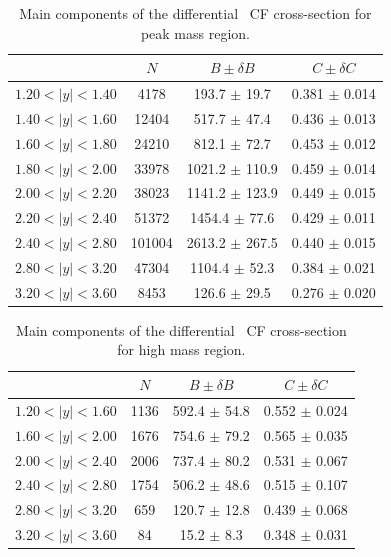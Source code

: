 \begin{table}
\centering
\begin{tabular}{lccc}
\hline \hline
    &   $N$   & $B \pm \delta B$  &  $C \pm \delta C$ \\
\hline
$1.20 < |y| <1.40$          & 4178       & 193.7      $\pm$ 19.7 & 0.381      $\pm$ 0.014 \\
$1.40 < |y| <1.60$          & 12404      & 517.7      $\pm$ 47.4 & 0.436      $\pm$ 0.013 \\
$1.60 < |y| <1.80$          & 24210      & 812.1      $\pm$ 72.7 & 0.453      $\pm$ 0.012 \\
$1.80 < |y| <2.00$          & 33978      & 1021.2     $\pm$ 110.9 & 0.459      $\pm$ 0.014 \\
$2.00 < |y| <2.20$          & 38023      & 1141.2     $\pm$ 123.9 & 0.449      $\pm$ 0.015 \\
$2.20 < |y| <2.40$          & 51372      & 1454.4     $\pm$ 77.6 & 0.429      $\pm$ 0.011 \\
$2.40 < |y| <2.80$          & 101004     & 2613.2     $\pm$ 267.5 & 0.440      $\pm$ 0.015 \\
$2.80 < |y| <3.20$          & 47304      & 1104.4     $\pm$ 52.3 & 0.384      $\pm$ 0.021 \\
$3.20 < |y| <3.60$          & 8453       & 126.6      $\pm$ 29.5 & 0.276      $\pm$ 0.020 \\
\hline \hline
\end{tabular}
\caption{Main components of the differential \Zee\ CF cross-section for peak mass region.}
\label{tab:Zee_NBC_peak}
\end{table}

\begin{table}
\centering
\begin{tabular}{lccc}
\hline \hline
    &   $N$   & $B \pm \delta B$  &  $C \pm \delta C$ \\
\hline
$1.20 < |y| <1.60$          & 1136       & 592.4      $\pm$ 54.8 & 0.552      $\pm$ 0.024 \\
$1.60 < |y| <2.00$          & 1676       & 754.6      $\pm$ 79.2 & 0.565      $\pm$ 0.035 \\
$2.00 < |y| <2.40$          & 2006       & 737.4      $\pm$ 80.2 & 0.531      $\pm$ 0.067 \\
$2.40 < |y| <2.80$          & 1754       & 506.2      $\pm$ 48.6 & 0.515      $\pm$ 0.107 \\
$2.80 < |y| <3.20$          & 659        & 120.7      $\pm$ 12.8 & 0.439      $\pm$ 0.068 \\
$3.20 < |y| <3.60$          & 84         & 15.2       $\pm$ 8.3 & 0.348      $\pm$ 0.031 \\
\hline \hline
\end{tabular}
\caption{Main components of the differential \Zee\ CF cross-section for high mass region.}
\label{tab:Zee_NBC_high}
\end{table}

